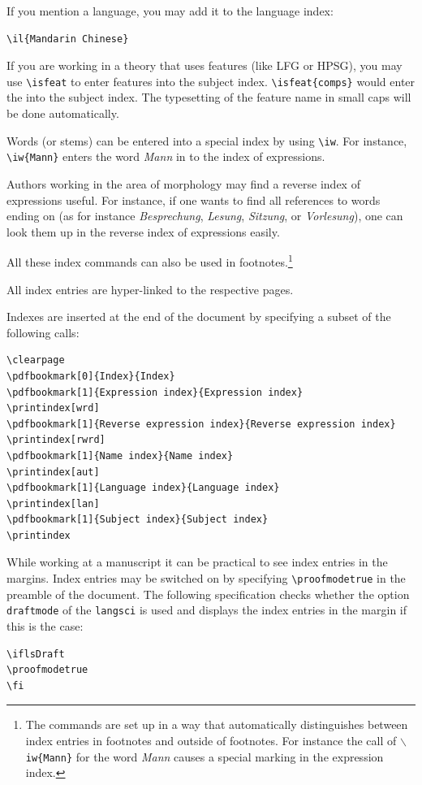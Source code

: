 If you mention a language, you may add it to the language index: 
\begin{verbatim}
\il{Mandarin Chinese}
\end{verbatim}
If you are working in a theory that uses features (like LFG or HPSG), you may use \verb+\isfeat+ to enter
features into the subject index. \verb+\isfeat{comps}+ would enter the \compsf into the subject
index. The typesetting of the feature name in {\sc small caps} will be done automatically.

Words (or stems) can be entered into a special index by using \verb+\iw+. For instance,
\verb+\iw{Mann}+ enters the word \emph{Mann} in to the index of expressions.

Authors working in the area of morphology may find a reverse index of expressions useful. For
instance, if one wants to find all references to words ending on  (as for instance \emph{Besprechung}, \emph{Lesung},
\emph{Sitzung}, or \emph{Vorlesung}), one can look them up
in the reverse index of expressions easily.

All these index commands can also be used in footnotes.\footnote{
  The commands are set up in a way that automatically distinguishes between index entries in
  footnotes and outside of footnotes. For instance the call of \texttt{$\backslash$iw\{Mann\}} for the word
  \emph{Mann} causes a special marking in the expression index.
}

All index entries are hyper-linked to the respective pages.

Indexes are inserted at the end of the document by specifying a subset of the following calls:
\begin{verbatim}
\clearpage
\pdfbookmark[0]{Index}{Index}
\pdfbookmark[1]{Expression index}{Expression index}
\printindex[wrd]
\pdfbookmark[1]{Reverse expression index}{Reverse expression index}
\printindex[rwrd]
\pdfbookmark[1]{Name index}{Name index}
\printindex[aut]
\pdfbookmark[1]{Language index}{Language index}
\printindex[lan]
\pdfbookmark[1]{Subject index}{Subject index}
\printindex
\end{verbatim}

While working at a manuscript it can be practical to see index entries in the margins. Index entries may be
switched on by specifying \verb+\proofmodetrue+ in the preamble of the
document. The following specification checks whether the option
\texttt{draftmode} of the \texttt{langsci} is used and displays the index entries in the margin if
this is the case:
\begin{verbatim}
\iflsDraft
\proofmodetrue
\fi
\end{verbatim}


